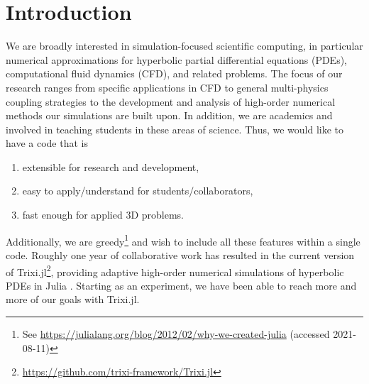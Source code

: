 \documentclass[hidelinks]{juliacon} %
\newcommand{\trixi}{Trixi.jl\xspace}
\begin{document}


\maketitle

\begin{abstract}
We present Trixi.jl, a Julia package for adaptive high-order numerical simulations
of hyperbolic partial differential equations (PDEs). Utilizing Julia's strengths,
Trixi.jl is extensible, easy to use, and fast. We describe the main design choices
that enable these features and compare Trixi.jl with an established open
source Fortran code for hyperbolic PDEs using the same numerical methods.
We conclude with an assessment of Julia for simulation-focused scientific
computing, an area that is still dominated by traditional high-performance
computing languages such as C, C++, and Fortran.
\end{abstract}


\section{Introduction}

We are broadly interested in simulation-focused scientific computing, in particular
numerical approximations for hyperbolic partial differential equations (PDEs), computational fluid dynamics (CFD),
and related problems. The focus of our research ranges from specific applications
in CFD to general multi-physics coupling strategies to the development and analysis of high-order numerical methods
our simulations are built upon. In addition, we are academics and involved in teaching
students in these areas of science. Thus, we would like to have a
code that is
\begin{enumerate}
  \item extensible for research and development,
  \item easy to apply/understand for students/collaborators,
  \item fast enough for applied 3D problems.
\end{enumerate}
Additionally, we are greedy\footnote{See \url{https://julialang.org/blog/2012/02/why-we-created-julia} (accessed 2021-08-11)}
and wish to include all these features within a single code.
Roughly one year of collaborative work has resulted in the current version of
\trixi\footnote{\url{https://github.com/trixi-framework/Trixi.jl}}, providing adaptive
high-order numerical simulations of hyperbolic PDEs
in Julia \cite{bezanson2017julia}. Starting as an experiment, we have been able
to reach more and more of our goals with \trixi.
\end{document}

